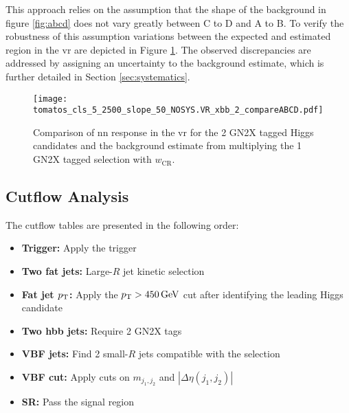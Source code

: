 This approach relies on the assumption that the shape of the background in figure \ref{fig:abcd} does not vary greatly between C to D and A to B. To verify the robustness of this assumption variations between the expected and estimated region in the \ac{vr} are depicted in Figure \ref{fig:compareABCD}. The observed discrepancies are addressed by assigning an uncertainty to the background estimate, which is further detailed in Section \ref{sec:systematics}.
\begin{figure}
    \centering
    \texttt{[image: tomatos\_cls\_5\_2500\_slope\_50\_NOSYS.VR\_xbb\_2\_compareABCD.pdf]}
    \caption[]{Comparison of \ac{nn} response in the \ac{vr} for the 2 GN2X tagged Higgs candidates and the background estimate from multiplying the 1 GN2X tagged selection with $w_\text{CR}$.}
    \label{fig:compareABCD}
\end{figure}

\subsection{Cutflow Analysis}
The cutflow tables are presented in the following order:

\begin{itemize}
    \item \textbf{Trigger:} Apply the trigger
    \item \textbf{Two fat jets:} Large-$R$ jet kinetic selection
    \item \textbf{Fat jet $p_{\text{T}}$:} Apply the $p_{\text{T}} > \qty[]{450}{GeV}$ cut after identifying the leading Higgs candidate
    \item \textbf{Two hbb jets:} Require 2 GN2X tags
    \item \textbf{VBF jets:} Find 2 small-$R$ jets compatible with the selection
    \item \textbf{VBF cut:} Apply cuts on $m_{j_1,j_2}$ and $|\Delta\eta(j_1,j_2)|$
    \item \textbf{SR:} Pass the signal region
\end{itemize}

